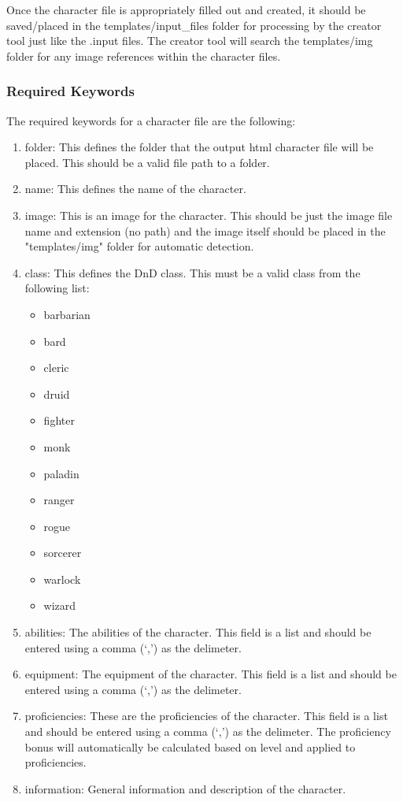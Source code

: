 Once the character file is appropriately filled out and created, it should be saved/placed in the templates/input\_files folder for processing by the creator tool just like the .input files. The creator tool will search the templates/img folder for any image references within the character files.






\subsubsection{Required Keywords}

The required keywords for a character file are the following:
\begin{enumerate}
	\item folder: This defines the folder that the output html character file will be placed. This should be a valid file path to a folder.
	\item name: This defines the name of the character.
	\item image: This is an image for the character. This should be just the image file name and extension (no path) and the image itself should be placed in the "templates/img" folder for automatic detection.
	\item class: This defines the DnD class. This must be a valid class from the following list:
		\begin{multicols}{3}
		    \begin{itemize}
		        \item barbarian
		        \item bard
		        \item cleric
		        \item druid
		        \item fighter
		        \item monk
		        \item paladin
		        \item ranger
		        \item rogue
		        \item sorcerer
		        \item warlock
		        \item wizard
		    \end{itemize}
		\end{multicols}
	\item abilities: The abilities of the character. This field is a list and should be entered using a comma (`,') as the delimeter.
	\item equipment: The equipment of the character. This field is a list and should be entered using a comma (`,') as the delimeter.
	\item proficiencies: These are the proficiencies of the character. This field is a list and should be entered using a comma (`,') as the delimeter. The proficiency bonus will automatically be calculated based on level and applied to proficiencies.
	\item information: General information and description of the character.
\end{enumerate}

